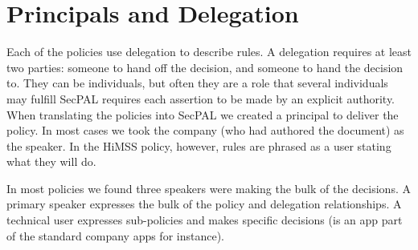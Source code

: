 \documentclass[conference,twocolumn]{IEEEtran}
\begin{document}
\section{Principals and Delegation}

Each of the policies use delegation to describe rules.
A delegation requires at least two parties: someone to hand off the decision, and someone to hand the decision to.
They can be individuals, but often they are a role that several individuals may fulfill
SecPAL requires each assertion to be made by an explicit authority.
When translating the policies into SecPAL we created a principal to deliver the policy.
In most cases we took the company (who had authored the document) as the speaker. 
In the HiMSS policy, however, rules are phrased as a user stating what they will do.

In most policies we found three speakers were making the bulk of the decisions.
A primary speaker expresses the bulk of the policy and delegation relationships.
A technical user expresses sub-policies and makes specific decisions (is an app part of the standard company apps for instance).
\end{document}
